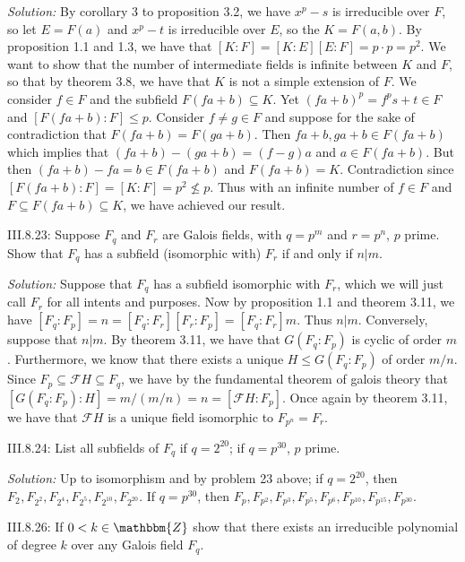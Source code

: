 \documentclass{letter}
\newcommand{\tmem}[1]{{\em #1\/}}
\begin{document}
{\tmem{Solution:}} By corollary 3 to proposition 3.2, we have $x^p - s$ is
irreducible over $F$, so let $E = F (a)$ and $x^p - t$ is irreducible over
$E$, so the $K = F (a, b)$. By proposition 1.1 and 1.3, we have that $[K : F]
= [K : E] [E : F] = p \cdot p = p^2$. We want to show that the number of
intermediate fields is infinite between $K$ and $F$, so that by theorem 3.8,
we have that $K$ is not a simple extension of $F$. We consider $f \in F$ and
the subfield $F (f a + b) \subseteq K$. Yet $(f a + b)^p = f^p s + t \in F$
and $[F (f a + b) : F] \leq p$. Consider $f \neq g \in F$ and suppose for the
sake of contradiction that $F (f a + b) = F (g a + b)$. Then $f a + b, g a + b
\in F (f a + b)$ which implies that $(f a + b) - (g a + b) = (f - g) a$ and $a
\in F (f a + b)$. But then $(f a + b) - f a = b \in F (f a + b)$ and $F (f a +
b) = K$. Contradiction since $[F (f a + b) : F] = [K : F] = p^2 \nleq p$. Thus
with an infinite number of $f \in F$ and $F \subseteq F (f a + b) \subseteq
K$, we have achieved our result.

III.8.23: Suppose $F_q$ and $F_r$ are Galois fields, with $q = p^m$ and $r =
p^n$, $p$ prime. Show that $F_q$ has a subfield (isomorphic with) $F_r$ if and
only if $n | m$.

{\tmem{Solution:}} Suppose that $F_q$ has a subfield isomorphic with $F_r$,
which we will just call $F_r$ for all intents and purposes. Now by proposition
1.1 and theorem 3.11, we have $[F_q : F_p] = n = [F_q : F_r] [F_r : F_p] =
[F_q : F_r] m$. Thus $n | m$. Conversely, suppose that $n | m$. By theorem
3.11, we have that $G (F_q : F_p)$ is cyclic of order $m$. Furthermore, we
know that there exists a unique $H \leq G (F_q : F_p)$ of order $m / n$. Since
$F_p \subseteq \mathcal{F} H \subseteq F_q$, we have by the fundamental
theorem of galois theory that $[G (F_q : F_p) : H] = m / (m / n) = n = [
\mathcal{F} H : F_p]$. Once again by theorem 3.11, we have that $\mathcal{F}
H$ is a unique field isomorphic to $F_{p^n} = F_r$.

III.8.24: List all subfields of $F_q$ if $q = 2^{20}$; if $q = p^{30}$, $p$
prime.

{\tmem{Solution:}} Up to isomorphism and by problem 23 above; if $q = 2^{20}$,
then $F_{2^{}}, F_{2^2}, F_{2^4}, F_{2^5}, F_{2^{10}}, F_{2^{20}}$. If $q =
p^{30}$, then $F_p, F_{p^2}, F_{p^3}, F_{p^5}, F_{p^6}, F_{p^{10}},
F_{p^{15}}, F_{p^{30}}$.

III.8.26: If $0 < k \in \mathbbm{Z}$ show that there exists an irreducible
polynomial of degree $k$ over any Galois field $F_q$.
\end{document}
